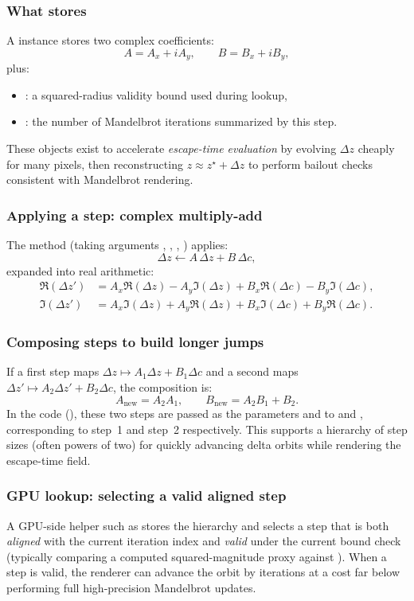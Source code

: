 \subsubsection{What  stores}
A  instance stores two complex coefficients:
\[
A = A_x + iA_y,\qquad B = B_x + iB_y,
\]
plus:
\begin{itemize}
  \item {}: a squared-radius validity bound used during lookup,
  \item {}: the number of Mandelbrot iterations summarized by this step.
\end{itemize}
These objects exist to accelerate \emph{escape-time evaluation} by evolving
\(\Delta z\) cheaply for many pixels, then reconstructing \(z \approx z^\star +
\Delta z\) to perform bailout checks consistent with Mandelbrot rendering.

\subsubsection{Applying a step: complex multiply-add}
The method  (taking arguments
, ,
, )
applies:
\[
\Delta z \leftarrow A\,\Delta z + B\,\Delta c,
\]
expanded into real arithmetic:
\begin{align}
\Re(\Delta z') &= A_x \Re(\Delta z) - A_y \Im(\Delta z) + B_x \Re(\Delta c) - B_y \Im(\Delta c), \\
\Im(\Delta z') &= A_x \Im(\Delta z) + A_y \Re(\Delta z) + B_x \Im(\Delta c) + B_y \Re(\Delta c).
\end{align}

\subsubsection{Composing steps to build longer jumps}
If a first step maps \(\Delta z \mapsto A_1\Delta z + B_1\Delta c\) and a second maps
\(\Delta z' \mapsto A_2\Delta z' + B_2\Delta c\), the composition is:
\[
A_{\text{new}} = A_2 A_1,\qquad B_{\text{new}} = A_2 B_1 + B_2.
\]
In the code (), these two steps are passed as the parameters
 and  to  and , corresponding to
step~1 and step~2 respectively.
This supports a hierarchy of step sizes (often powers of two) for quickly
advancing delta orbits while rendering the escape-time field.

\subsubsection{GPU lookup: selecting a valid aligned step}
A GPU-side helper such as  stores the hierarchy and selects a
step that is both \emph{aligned} with the current iteration index and
\emph{valid} under the current bound check (typically comparing a computed
squared-magnitude proxy  against ). When a step is valid, the
renderer can advance the orbit by  iterations at a cost far below
performing  full high-precision Mandelbrot updates.

